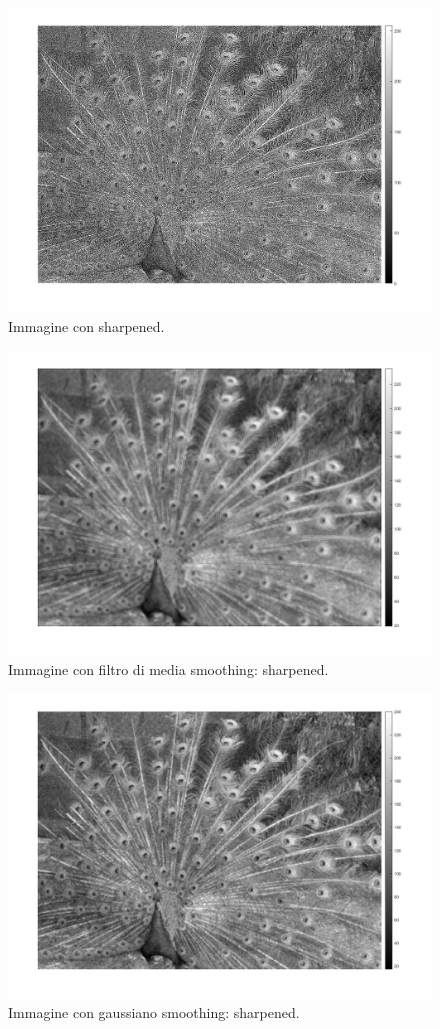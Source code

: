 \documentclass[a4paper]{article}
\begin{document}
	\begin{figure}[!htp]
		\centering
		\includegraphics[width=.9\textwidth]{img/lab/operato-locali-9.jpg}
		\caption{Immagine con sharpened.}
	\end{figure}
	\begin{figure}[!htp]
		\centering
		\includegraphics[width=.9\textwidth]{img/lab/operato-locali-10.jpg}
		\caption{Immagine con filtro di media smoothing: sharpened.}
	\end{figure}\newpage
	
	\begin{figure}[!htp]
		\centering
		\includegraphics[width=.9\textwidth]{img/lab/operato-locali-11.jpg}
		\caption{Immagine con gaussiano smoothing: sharpened.}
	\end{figure}\newpage
	
\end{document}
